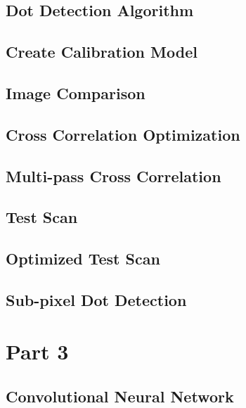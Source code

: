 \subsection{Dot Detection Algorithm}
 \label{code:2.1}

\subsection{Create Calibration Model}
 \label{code:2.2}

\subsection{Image Comparison}
 \label{code:2.3}

\subsection{Cross Correlation Optimization}
 \label{code:2.4}

\subsection{Multi-pass Cross Correlation}
 \label{code:2.5}

\subsection{Test Scan}
 \label{code:2.6}

\subsection{Optimized Test Scan}
 \label{code:2.7}

\subsection{Sub-pixel Dot Detection}
 \label{code:2.8}

\section{Part 3}
\subsection{Convolutional Neural Network}
 \label{code:3.1}

